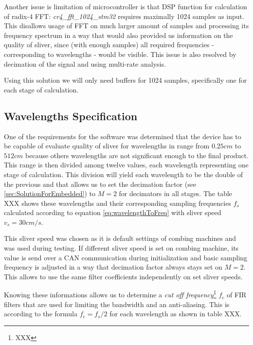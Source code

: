 \documentclass[twoside]{ctuthesis}
\theoremstyle{plain}
\theoremstyle{definition}
\theoremstyle{note}
\begin{document}
Another issue is limitation of microcontroller is that DSP function for calculation of radix-4 FFT: \textit{cr4\_fft\_1024\_stm32} requires maximally 1024 samples as input. This disallows usage of FFT on much larger amount of samples and processing its frequency spectrum in a way that would also provided us information on the quality of sliver, since (with enough samples) all required frequencies - corresponding to wavelengths - would be visible. This issue is also resolved by decimation of the signal and using multi-rate analysis. 

Using this solution we will only need buffers for 1024 samples, specifically one for each stage of calculation.

\subsection{Wavelengths Specification}
One of the requirements for the software was determined that the device has to be capable of evaluate quality of sliver for wavelengths in range from $0.25 cm$ to $512 cm$ because others wavelengths are not significant enough to the final product. This range is then divided among twelve values, each wavelength representing one stage of calculation. This division will yield each wavelength to be the double of the previous and that allows us to set the decimation factor (see \ref{sec:SolutionForEmbedded}) to $M=2$ for decimators in all stages. The table XXX shows these wavelengths and their corresponding sampling frequencies $f_s$ calculated according to equation \ref{eq:wavelengthToFreq} with sliver speed $v_{s}=30 cm/s$. 

This sliver speed was chosen as it is default settings of combing machines and was used during testing. If different sliver speed is set on combing machine, its value is send over a CAN communication during initialization and basic sampling frequency is adjusted in a way that decimation factor always stays set on $M=2$. This allows to use the same filter coefficients independently on set sliver speeds.

Knowing these informations allows us to determine a \textit{cut off frequency}\footnote{XXX} $f_c$ of FIR filters that are used for limiting the bandwidth and an anti-aliasing. This is according to the formula $f_c=f_s/2$ for each wavelength as shown in table XXX.
\end{document}
